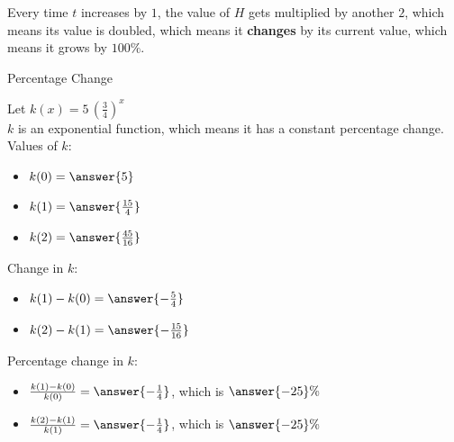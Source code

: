 \documentclass{ximera}
\begin{document}
Every time $t$ increases by $1$, the value of $H$ gets multiplied by another $2$, which means its value is doubled, which means it \textbf{changes} by its current value, which means it grows by $100\%$.











\begin{example} Percentage Change



Let $k(x) = 5 \, \left(\frac{3}{4}\right)^x$ \\

$k$ is an exponential function, which means it has a constant percentage change. \\

Values of $k$:

\begin{itemize}
\item $k(0) = \answer{5}$

\item $k(1) = \answer{\frac{15}{4}}$

\item $k(2) = \answer{\frac{45}{16}}$
\end{itemize}



Change in $k$:

\begin{itemize}
\item $k(1) - k(0) = \answer{-\frac{5}{4}}$

\item $k(2) - k(1) = \answer{-\frac{15}{16}}$

\end{itemize}





Percentage change in $k$:

\begin{itemize}
\item $\frac{k(1) - k(0)}{k(0)} = \answer{-\frac{1}{4}}$, which is $\answer{-25}\%$

\item $\frac{k(2) - k(1)}{k(1)} = \answer{-\frac{1}{4}}$, which is $\answer{-25}\%$

\end{itemize}






\end{example}
\end{document}
